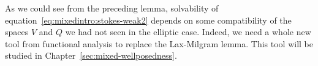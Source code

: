 \begin{remark}
  As we could see from the preceding lemma, solvability of
  equation~\eqref{eq:mixedintro:stokes-weak2} depends on some
  compatibility of the spaces $V$ and $Q$ we had not seen in the
  elliptic case. Indeed, we need a whole new tool from functional
  analysis to replace the Lax-Milgram lemma. This tool will be studied
  in Chapter~\ref{sec:mixed-wellposedness}.
\end{remark}

